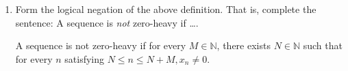 \documentclass[12pt]{article}
\newcommand{\NN}{\mathbb{N}}
\begin{document}
\begin{enumerate}
\begin{enumerate}
No. For example:

\[
x_n =
\begin{cases}
	0 & \text{if } n \text{ is a perfect square} \\
	1 & \text{otherwise} \\
\end{cases}
\]

\begin{proof}
$ $

Let $M \in \NN$ be arbitrary.

Let $k \in \NN$ be such that $k > M$.

Let $N = k^2 + 1$.

Then $k^2 + 1 \le N + M = k^2 + 1 + M < k^2 + k + 1 < k^2 + 2k + 1 < (k + 1)^2$.

Then for every $n$ satisfying $N \le n \le N + M, x_n = 1$.

Therefore, $(x_n)$ is not zero-heavy.
\end{proof}

\item Form the logical negation of the above definition. That is, complete the sentence: A sequence is \textit{not} zero-heavy if \dots.

A sequence is not zero-heavy if for every $M \in \NN$, there exists $N \in \NN$ such that for every $n$ satisfying $N \le n \le N + M, x_n \ne 0$.
\end{enumerate}

\end{enumerate}
\end{document}
